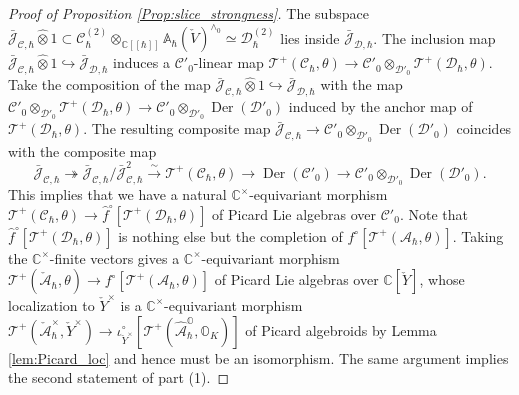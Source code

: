 \documentclass[12pt]{amsart}
\newcommand{\C}{\mathbb{C}}
\newcommand{\A}{\mathcal{A}}
\newcommand{\J}{\mathcal{J}}
\newcommand{\Orb}{\mathbb{O}}
\newcommand{\T}{\mathcal{T}}
\newcommand{\TT}{\mathscr{T}}
\newcommand{\cm}{\C^\times}
\newcommand{\Weyl}{\mathbb{A}}
\newcommand{\Dcal}{\mathcal{D}}
\newcommand{\der}{{\operatorname{Der}}}
\theoremstyle{definition}
\numberwithin{equation}{section}
\begin{document}
\begin{proof}[Proof of Proposition \ref{Prop:slice_strongness}]
  The subspace $\bar{\J}_{\mathcal{C},\hbar} \widehat{\otimes} 1 \subset \mathcal{C}_\hbar^{(2)} \widehat{\otimes}_{\C[[\hbar]]}  \Weyl_\hbar(\check{V} )^{\wedge_0}  \simeq \Dcal_\hbar^{(2)}$ lies inside $\bar{\J}_{\Dcal,\hbar}$. The inclusion map $\bar{\J}_{\mathcal{C},\hbar} \widehat{\otimes} 1 \hookrightarrow \bar{\J}_{\Dcal,\hbar}$ induces a $\mathcal{C}'_0$-linear map $\T^+(\mathcal{C}_\hbar, \theta) \to \mathcal{C}'_0 \otimes_{\Dcal'_0} \T^+(\Dcal_\hbar, \theta) $. Take the composition of the map $\bar{\J}_{\mathcal{C},\hbar} \widehat{\otimes} 1 \hookrightarrow \bar{\J}_{\Dcal,\hbar}$ with the map $\mathcal{C}'_0 \otimes_{\Dcal'_0} \T^+(\Dcal_\hbar, \theta) \to \mathcal{C}'_0 \otimes_{\Dcal'_0} \der(\Dcal'_0)$ induced by the anchor map of $\T^+(\Dcal_\hbar, \theta)$. The resulting composite map $\bar{\J}_{\mathcal{C},\hbar}\rightarrow \mathcal{C}'_0 \otimes_{\Dcal'_0} \der(\Dcal'_0)$  coincides with the composite map 
  $$\bar{\J}_{\mathcal{C},\hbar}\twoheadrightarrow 
  \bar{\J}_{\mathcal{C},\hbar}/\bar{\J}_{\mathcal{C},\hbar}^2\xrightarrow{\sim}\T^+(\mathcal{C}_\hbar, \theta) \to \der(\mathcal{C}'_0) \to \mathcal{C}'_0 \otimes_{\Dcal'_0} \der(\Dcal'_0).$$
  This implies that we have a natural $\cm$-equivariant morphism $\T^+(\mathcal{C}_\hbar, \theta) \to \hat{f}^\circ [\T^+(\Dcal_\hbar, \theta)]$ of Picard Lie algebras over $\mathcal{C}'_0$. Note that $\hat{f}^\circ [\T^+(\Dcal_\hbar, \theta)]$ is nothing else but the completion of $f^\circ [\T^+(\A_\hbar, \theta)]$. %
  Taking the $\cm$-finite vectors gives a $\cm$-equivariant morphism $\T^+(\check{\A}_\hbar, \theta) \to f^\circ [\T^+(\A_\hbar, \theta)]$ of Picard Lie algebras over $\C[\check{Y}]$, whose localization to $\check{Y}^{\times}$ is a $\cm$-equivariant morphism $\TT^+(\check{\A}_\hbar^\times, \check{Y}^\times) \to \iota_{\check{Y}^\times}^\circ [ \TT^+(\hat{\A}_\hbar^{\Orb}, \Orb_K)]$ of Picard algebroids by Lemma \ref{lem:Picard_loc} and hence must be an isomorphism. The same argument implies the second statement of part (1).


\end{proof}
\end{document}
